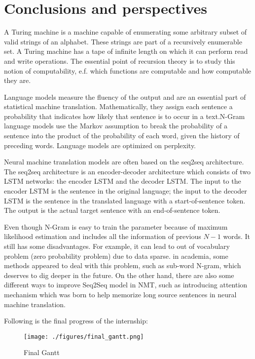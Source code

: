 \setcounter{secnumdepth}{-1}
%
%

\chapter{Conclusions and perspectives}
\setcounter{secnumdepth}{3}

A Turing machine is a machine capable of enumerating some arbitrary subset of valid strings of an alphabet. These strings are part of a recursively enumerable set. A Turing machine has a tape of infinite length on which it can perform read and write operations. The essential point of recursion theory is to study this notion of computability, e.f. which functions are computable and how computable they are. 

Language models measure the fluency of the output and are an essential part of statistical machine translation. Mathematically, they assign each sentence a probability that indicates how likely that sentence is to occur in a text.N-Gram language models use the Markov assumption to break the probability of a sentence into the product of the probability of each word, given the history of preceding words. Language models are optimized on perplexity. 

Neural machine translation models are often based on the seq2seq architecture. The seq2seq architecture is an encoder-decoder architecture which consists of two LSTM networks: the encoder LSTM and the decoder LSTM. The input to the encoder LSTM is the sentence in the original language; the input to the decoder LSTM is the sentence in the translated language with a start-of-sentence token. The output is the actual target sentence with an end-of-sentence token.

Even though N-Gram is easy to train the parameter because of maximum likelihood estimation and includes all the information of previous $N-1$ words. It still has some disadvantages. For example, it can lead to out of vocabulary problem (zero probability problem) due to data sparse. in academia, some methods appeared to deal with this problem, such as sub-word N-gram, which deserves to dig deeper in the future. On the other hand, there are also some different ways to improve Seq2Seq model in NMT, such as introducing attention mechanism which was born to help memorize long source sentences in neural machine translation.

Following is the final progress of the internship:

\begin{figure}
	\centering
	\texttt{[image: ./figures/final\_gantt.png]}
	\caption{Final Gantt}
\end{figure}


